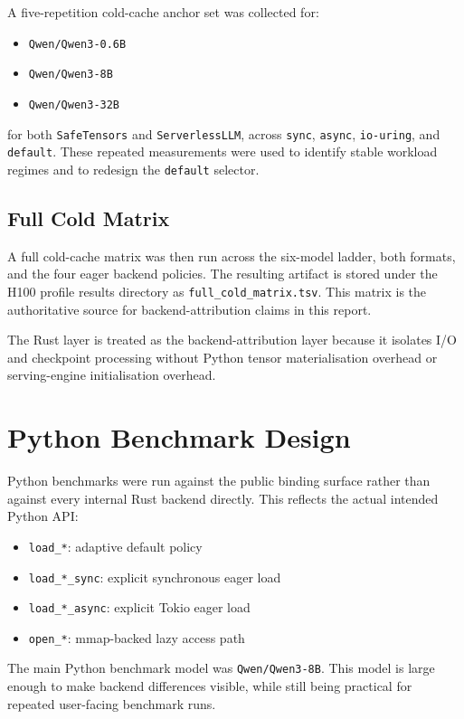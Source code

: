 A five-repetition cold-cache anchor set was collected for:

\begin{itemize}
\item \texttt{Qwen/Qwen3-0.6B}
\item \texttt{Qwen/Qwen3-8B}
\item \texttt{Qwen/Qwen3-32B}
\end{itemize}

for both \texttt{SafeTensors} and \texttt{ServerlessLLM}, across \texttt{sync}, \texttt{async}, \texttt{io-uring}, and \texttt{default}. These repeated measurements were used to identify stable workload regimes and to redesign the \texttt{default} selector.

\subsection{Full Cold Matrix}

A full cold-cache matrix was then run across the six-model ladder, both formats, and the four eager backend policies. The resulting artifact is stored under the H100 profile results directory as \texttt{full\_cold\_matrix.tsv}. This matrix is the authoritative source for backend-attribution claims in this report.

The Rust layer is treated as the backend-attribution layer because it isolates I/O and checkpoint processing without Python tensor materialisation overhead or serving-engine initialisation overhead.

\section{Python Benchmark Design}

Python benchmarks were run against the public binding surface rather than against every internal Rust backend directly. This reflects the actual intended Python API:

\begin{itemize}
\item \texttt{load\_*}: adaptive default policy
\item \texttt{load\_*\_sync}: explicit synchronous eager load
\item \texttt{load\_*\_async}: explicit Tokio eager load
\item \texttt{open\_*}: mmap-backed lazy access path
\end{itemize}

The main Python benchmark model was \texttt{Qwen/Qwen3-8B}. This model is large enough to make backend differences visible, while still being practical for repeated user-facing benchmark runs.

